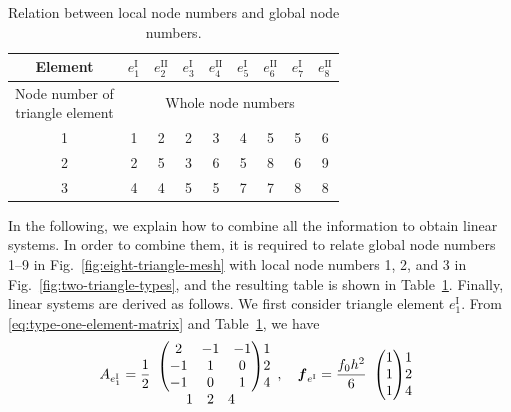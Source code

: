 \begin{table}[htbp]\centering
\caption{{Relation between local node numbers and global node numbers.}}\label{tab:local-global-node-numbers}
\begin{tabular}{c|cccccccc}\hline
{Element}&$e_1^{\mathrm I}$&$e_2^{\mathrm {II}}$&$e_3^{\mathrm I}$&$e_4^{\mathrm {II}}$&$e_5^{\mathrm I}$&$e_6^{\mathrm {II}}$&$e_7^{\mathrm I}$&$e_8^{\mathrm {II}}$\\\hline
\shortstack{{Node number of}\\{triangle element}}&\multicolumn{8}{c}{{Whole node numbers}}\\\hline
1&1&2&2&3&4&5&5&6\\2&2&5&3&6&5&8&6&9\\3&4&4&5&5&7&7&8&8\\\hline
\end{tabular}\end{table}
{In the following, we explain how to combine all the information to obtain linear systems. In order to combine them, it is required to relate global node numbers 1--9 in Fig.\ \ref{fig:eight-triangle-mesh} with local node numbers 1, 2, and 3 in Fig.\ \ref{fig:two-triangle-types}, and the resulting table is shown in Table\ \ref{tab:local-global-node-numbers}. Finally, linear systems are derived as follows. We first consider triangle element $e_1^{\mathrm I}$. From \eqref{eq:type-one-element-matrix} and Table\ \ref{tab:local-global-node-numbers}, we have}
\[A_{e_1^{\mathrm I}}=\frac12\begin{array}{c@{}c}
\begin{pmatrix}2&-1&-1\\-1&1&0\\-1&0&1\end{pmatrix}&\begin{matrix}1\\2\\4\end{matrix}\\
\begin{matrix}1&2&4\end{matrix}&\end{array},\quad
\boldsymbol{f}_{e^{\mathrm I}}=\frac{f_0h^2}{6}\begin{array}{c@{}c}\begin{pmatrix}1\\1\\1\end{pmatrix}&\begin{matrix}1\\2\\4\end{matrix}\end{array}\]
